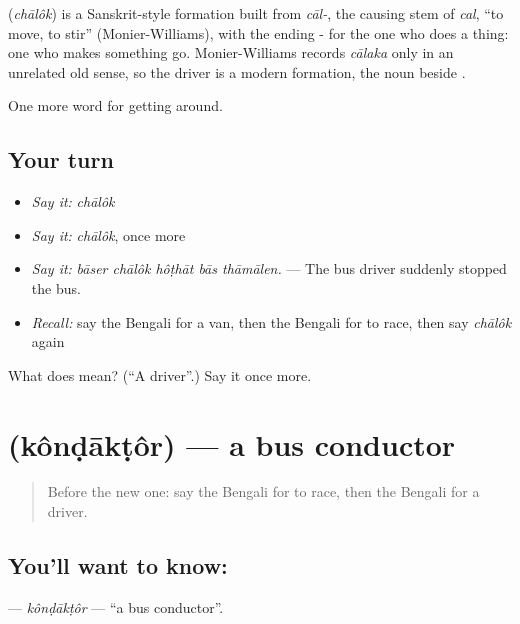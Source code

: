 \begin{cousinweb}
\textbf{} (\emph{chālôk}) is a Sanskrit-style formation built from \emph{cāl-}, the causing stem of \emph{cal}, \textquotedblleft{}to move, to stir\textquotedblright{} (Monier-Williams), with the ending - for the one who does a thing: one who makes something go. Monier-Williams records \emph{cālaka} only in an unrelated old sense, so the driver is a modern formation, the noun beside .
\end{cousinweb}

\begin{grammarlens}[title={What you've built}]
One more word for getting around.
\end{grammarlens}

\subsection*{Your turn}
\begin{itemize}
\raggedright
  \item \emph{Say it:} \emph{chālôk}
  \item \emph{Say it:} \emph{chālôk}, once more
  \item \emph{Say it:} \emph{bāser chālôk hôṭhāt bās thāmālen.} — The bus driver suddenly stopped the bus.
  \item \emph{Recall:} say the Bengali for a van, then the Bengali for to race, then say \emph{chālôk} again
\end{itemize}

\begin{tcolorbox}[breakable,colback=teal!4,colframe=teal!35!black,title={Before you move on}]
What does  mean? (\textquotedblleft{}A driver\textquotedblright{}.) Say it once more.
\end{tcolorbox}
\section[\texorpdfstring{\bn{কন্ডাক্টর} (kônḍākṭôr)}{কন্ডাক্টর (kônḍākṭôr)}]{ (kônḍākṭôr) — a bus conductor}

\label{lesson:BN-C389-kondaktor}



\begin{quote}
Before the new one: say the Bengali for to race, then the Bengali for a driver.
\end{quote}

\subsection*{You'll want to know: }
\textbf{} — \emph{kônḍākṭôr} — \textquotedblleft{}a bus conductor\textquotedblright{}.

